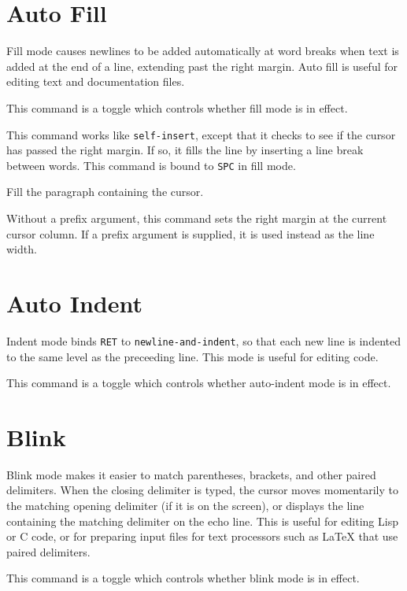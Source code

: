 \section{Auto Fill}

Fill mode causes newlines to be added automatically at word
breaks when text is added at the end of a line, extending past the
right margin.  Auto fill is useful for editing text and documentation
files.

\fbody This command is a toggle which controls whether fill mode is
in effect.

\fbody This command works like {\tt self-insert}, except that it checks
to see if the cursor has passed the right margin.  If so, it fills
the line by inserting a line break between words.  This command is bound to 
{\tt SPC} in fill mode.

\fbody Fill the paragraph containing the cursor.

\fbody Without a prefix argument, this command sets the right margin
at the current cursor column.  If a prefix argument is supplied, it is used
instead as the line width.

\section{Auto Indent}

Indent mode binds {\tt RET} to {\tt newline-and-indent}, so
that each new line is indented to the same level as the preceeding
line.  This mode is useful for editing code. 

\fbody This command is a toggle which controls whether auto-indent mode
is in effect.

\section{Blink}

Blink mode makes it easier to match parentheses, brackets, and other
paired delimiters.  When the closing delimiter is typed, the cursor
moves momentarily to the matching opening delimiter (if it is on the
screen), or displays the line containing the matching delimiter on the
echo line.  This is useful for editing Lisp or C code, or for
preparing input files for text processors such as LaTeX that use
paired delimiters. 

\fbody This command is a toggle which controls whether blink mode is
in effect.

